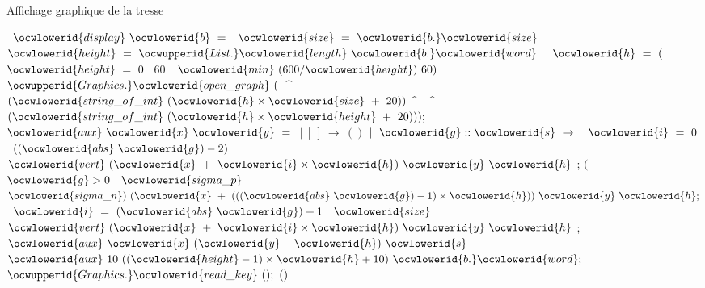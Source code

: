 \documentclass[12pt]{article}
\begin{document}
\ocwendcode{}\ocwindent{0.00em}
Affichage graphique de la tresse

\ocweol
\label{Braid_Print.ml:2807}%
\medskip
\ocwbegincode{}\ocwindent{0.00em}
~$\ocwlowerid{display}~\ocwlowerid{b}~=$\ocweol
\ocwindent{2.00em}
~$\ocwlowerid{size}~=~\ocwlowerid{b.}\ocwlowerid{size}~$~$\ocwlowerid{height}~=~\ocwupperid{List.}\ocwlowerid{length}~\ocwlowerid{b.}\ocwlowerid{word}~$\ocweol
\ocwindent{2.00em}
~$\ocwlowerid{h}~=~($~$\ocwlowerid{height}~=~0~$~60~~$\ocwlowerid{min}~(600/\ocwlowerid{height})~60)~$\ocweol
\ocwindent{2.00em}
$\ocwupperid{Graphics.}\ocwlowerid{open\_graph}~($~\^{}~$(\ocwlowerid{string\_of\_int}~(\ocwlowerid{h}\times{}\ocwlowerid{size}~+~20))~$\^{}~~\^{}~$(\ocwlowerid{string\_of\_int}~(\ocwlowerid{h}\times{}\ocwlowerid{height}~+~20)));$\ocweol
\ocwindent{2.00em}
~~$\ocwlowerid{aux}~\ocwlowerid{x}~\ocwlowerid{y}~=~$\ocweol
\ocwindent{4.00em}
$\mid{}~[\,]~\rightarrow{}~()$\ocweol
\ocwindent{4.00em}
$\mid{}~\ocwlowerid{g}::\ocwlowerid{s}~\rightarrow{}~$~$\ocwlowerid{i}~=~0~$~$((\ocwlowerid{abs}~\ocwlowerid{g})-2)~$\ocweol
\ocwindent{11.50em}
$\ocwlowerid{vert}~(\ocwlowerid{x}~+~\ocwlowerid{i}\times{}\ocwlowerid{h})~\ocwlowerid{y}~\ocwlowerid{h}$\ocweol
\ocwindent{9.50em}
;\ocweol
\ocwindent{9.50em}
$($~$\ocwlowerid{g}>0~$~$\ocwlowerid{sigma\_p}~$~$\ocwlowerid{sigma\_n})~(\ocwlowerid{x}~+~(((\ocwlowerid{abs}~\ocwlowerid{g})-1)\times{}\ocwlowerid{h}))~\ocwlowerid{y}~\ocwlowerid{h};$\ocweol
\ocwindent{9.50em}
~$\ocwlowerid{i}~=~(\ocwlowerid{abs}~\ocwlowerid{g})+1~$~$\ocwlowerid{size}~$\ocweol
\ocwindent{11.50em}
$\ocwlowerid{vert}~(\ocwlowerid{x}~+~\ocwlowerid{i}\times{}\ocwlowerid{h})~\ocwlowerid{y}~\ocwlowerid{h}$\ocweol
\ocwindent{9.50em}
;\ocweol
\ocwindent{9.50em}
$\ocwlowerid{aux}~\ocwlowerid{x}~(\ocwlowerid{y}-\ocwlowerid{h})~\ocwlowerid{s}~$\ocweol
\ocwindent{2.50em}
$\ocwlowerid{aux}~10~((\ocwlowerid{height}-1)\times{}\ocwlowerid{h}+10)~\ocwlowerid{b.}\ocwlowerid{word};$\ocweol
\ocwindent{2.50em}
$\ocwupperid{Graphics.}\ocwlowerid{read\_key}~();~()$\ocweol
\ocwendcode{}
\end{document}

